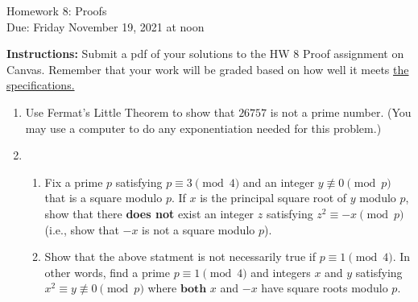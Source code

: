 \documentclass[10pt,a4paper]{article}
\begin{document}
\begin{center}
{\Large Homework 8: Proofs}\\
Due: Friday November 19, 2021 at noon\\


\end{center}
{\bf Instructions:} Submit a pdf of your solutions to the HW 8 Proof assignment on Canvas. Remember that your work will be graded based on how well it meets \href{https://docs.google.com/document/d/1emM06_WRh_h941rsjtRE9fRVndJtfRKd9gyS3Fs_rFA/edit?usp=sharing}{the specifications. }

\begin{enumerate}
\item Use Fermat's Little Theorem to show that $26757$ is not a prime number. (You may use a computer to do any exponentiation needed for this problem.)
\item \begin{enumerate}
 \item Fix a prime $p$ satisfying $p \equiv 3 \pmod 4$ and an integer $y \not \equiv 0 \pmod p$ that is a square modulo $p$.  If $x$ is the principal square root of $y$ modulo $p$, show that there \textbf{does not} exist an integer $z$ satisfying $z^2 \equiv -x \pmod p$ (i.e., show that $-x$ is not a square modulo $p$).
 \item Show that the above statment is not necessarily true if $p\equiv 1\pmod{4}$. In other words, find a prime $p\equiv 1\pmod4$ and  integers $x$ and $y$ satisfying $x^2 \equiv y \not \equiv 0 \pmod p$ where $\textbf{both}$ $x$ and $-x$ have square roots modulo $p$.
\end{enumerate}

\end{enumerate}
\end{document}
